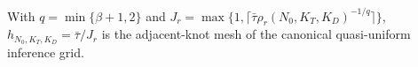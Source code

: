 With \(q=\min\{\beta+1,2\}\) and \(J_r=\max\{1,\lceil\bar\tau\rho_r(N_0,K_T,K_D)^{-1/q}\rceil\}\), \(h_{N_0,K_T,K_D}=\bar\tau/J_r\) is the adjacent-knot mesh of the canonical quasi-uniform inference grid.